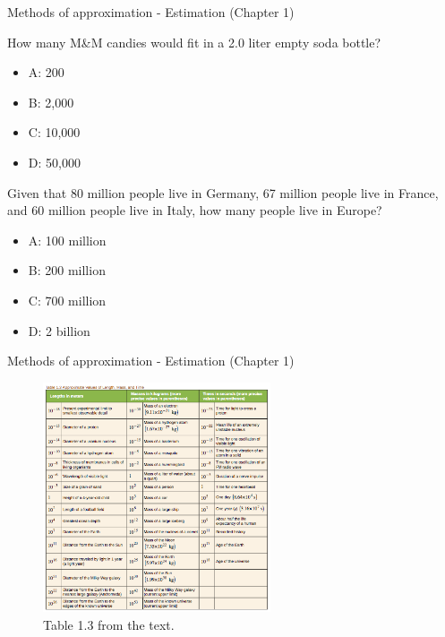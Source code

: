 \documentclass{beamer}
\begin{document}
\begin{frame}{Methods of approximation - Estimation (Chapter 1)}
\small
\begin{minipage}[b]{0.45\linewidth}
How many M\&M candies would fit in a 2.0 liter empty soda bottle?
\vspace{0.6cm}
\begin{itemize}
\item A: 200
\item B: 2,000
\item C: 10,000
\item D: 50,000
\end{itemize}
\end{minipage}
\hspace{0.5cm}
\begin{minipage}[b]{0.45\linewidth}
Given that 80 million people live in Germany, 67 million people live in France, and 60 million people live in Italy, how many people live in Europe?
\vspace{0.1cm}
\begin{itemize}
\item A: 100 million
\item B: 200 million
\item C: 700 million
\item D: 2 billion
\end{itemize}
\end{minipage}
\end{frame}

\begin{frame}{Methods of approximation - Estimation (Chapter 1)}
\begin{figure}
\centering
\includegraphics[width=0.6\textwidth]{figures/tab1.png}
\caption{\label{fig:tab1} Table 1.3 from the text.}
\end{figure}
\end{frame}
\end{document}
